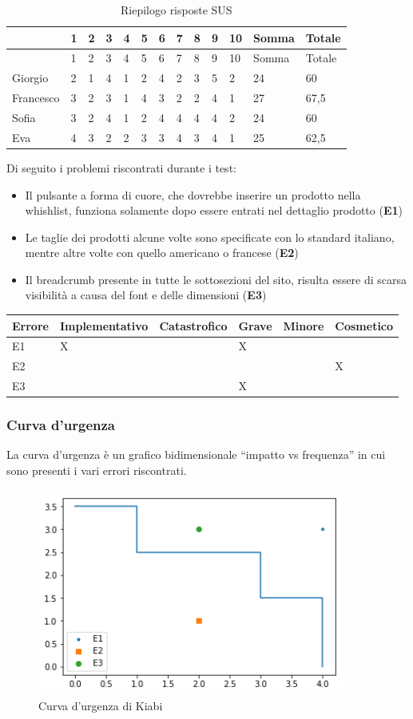 \documentclass[12pt,italian,]{report}
\begin{document}
\begin{longtable}[]{@{}lllllllllllll@{}}
\caption{Riepilogo risposte SUS}\tabularnewline
\toprule
& 1 & 2 & 3 & 4 & 5 & 6 & 7 & 8 & 9 & 10 & Somma & Totale\tabularnewline
\midrule
\endfirsthead
\toprule
& 1 & 2 & 3 & 4 & 5 & 6 & 7 & 8 & 9 & 10 & Somma & Totale\tabularnewline
\midrule
\endhead
Giorgio & 2 & 1 & 4 & 1 & 2 & 4 & 2 & 3 & 5 & 2 & 24 & 60\tabularnewline
Francesco & 3 & 2 & 3 & 1 & 4 & 3 & 2 & 2 & 4 & 1 & 27 &
67,5\tabularnewline
Sofia & 3 & 2 & 4 & 1 & 2 & 4 & 4 & 4 & 4 & 2 & 24 &
60\tabularnewline
Eva & 4 & 3 & 2 & 2 & 3 & 3 & 4 & 3 & 4 & 1 & 25 &
62,5\tabularnewline
\bottomrule
\end{longtable}

Di seguito i problemi riscontrati durante i test:

\begin{itemize}
\item Il pulsante a forma di cuore, che dovrebbe inserire un prodotto nella whishlist, funziona solamente dopo essere entrati nel dettaglio prodotto (\textbf{E1})
\item Le taglie dei prodotti alcune volte sono specificate con lo standard italiano, mentre altre volte con quello americano o francese (\textbf{E2})
\item Il breadcrumb presente in tutte le sottosezioni del sito, risulta essere di scarsa visibilità a causa del font e delle dimensioni (\textbf{E3})
\end{itemize}

\begin{longtable}[]{@{}llllll@{}}
\toprule
Errore & Implementativo & Catastrofico & Grave & Minore &
Cosmetico\tabularnewline
\midrule
\endhead
E1 & X & & X &\tabularnewline
E2 & & & & & X\tabularnewline
E3 & & & X & &\tabularnewline
\bottomrule
\end{longtable}

\subsubsection{Curva d'urgenza}

La curva d'urgenza è un grafico bidimensionale ``impatto vs frequenza'' in cui sono presenti i vari errori riscontrati.

\begin{figure}[h]
\caption{Curva d'urgenza di Kiabi}
\includegraphics[width=0.90\textwidth]{img/curve_urgenza_kiabi}
\centering
\end{figure}
\end{document}
